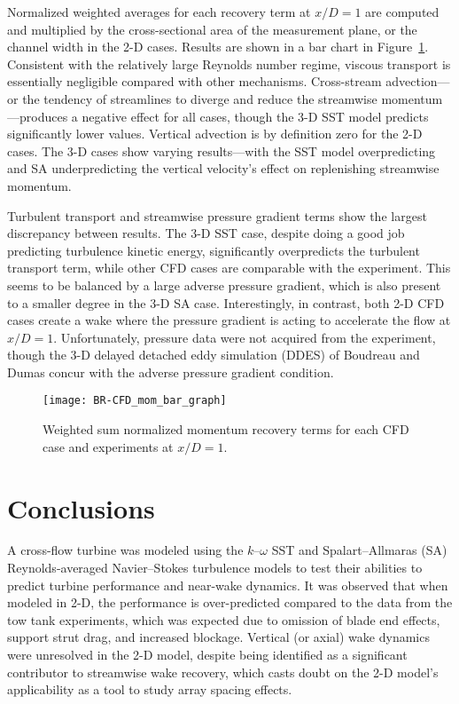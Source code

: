 Normalized weighted averages for each recovery term at $x/D=1$ are computed and
multiplied by the cross-sectional area of the measurement plane, or the channel
width in the 2-D cases. Results are shown in a bar chart in
Figure~\ref{fig:br-cfd-recovery}. Consistent with the relatively large Reynolds
number regime, viscous transport is essentially negligible compared with other
mechanisms. Cross-stream advection---or the tendency of streamlines to diverge
and reduce the streamwise momentum---produces a negative effect for all cases,
though the 3-D SST model predicts significantly lower values. Vertical advection
is by definition zero for the 2-D cases. The 3-D cases show varying
results---with the SST model overpredicting and SA underpredicting the vertical
velocity's effect on replenishing streamwise momentum.

Turbulent transport and streamwise pressure gradient terms show the largest
discrepancy between results. The 3-D SST case, despite doing a good job
predicting turbulence kinetic energy, significantly overpredicts the turbulent
transport term, while other CFD cases are comparable with the experiment. This
seems to be balanced by a large adverse pressure gradient, which is also present
to a smaller degree in the 3-D SA case. Interestingly, in contrast, both 2-D CFD
cases create a wake where the pressure gradient is acting to accelerate the flow
at $x/D=1$. Unfortunately, pressure data were not acquired from the experiment,
though the 3-D delayed detached eddy simulation (DDES) of Boudreau and Dumas
\cite{Boudreau2015} concur with the adverse pressure gradient condition.

\begin{figure}
    \centering

    \texttt{[image: BR-CFD\_mom\_bar\_graph]}

    \caption{Weighted sum normalized momentum recovery terms for each CFD case
        and experiments\cite{Bachant2016-RVAT-Re-dep} at $x/D=1$.}

    \label{fig:br-cfd-recovery}
\end{figure}


\section{Conclusions}

A cross-flow turbine was modeled using the $k$--$\omega$ SST and
Spalart--Allmaras (SA) Reynolds-averaged Navier--Stokes turbulence models to test
their abilities to predict turbine performance and near-wake dynamics. It was
observed that when modeled in 2-D, the performance is over-predicted compared to
the data from the tow tank experiments, which was expected due to omission of
blade end effects, support strut drag, and increased blockage. Vertical (or
axial) wake dynamics were unresolved in the 2-D model, despite being identified
as a significant contributor to streamwise wake recovery, which casts doubt on
the 2-D model's applicability as a tool to study array spacing effects.

